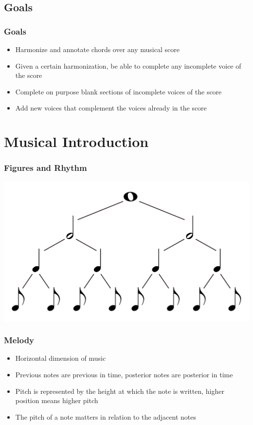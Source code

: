 \documentclass[english]{beamer}
\begin{document}
\subsection{Goals}
	\begin{frame}
	\frametitle{Goals}
		\begin{itemize}
			\item Harmonize and annotate chords over any musical score
			\item Given a certain harmonization, be able to complete any incomplete voice of the score
			\item Complete on purpose blank sections of incomplete voices of the score
			\item Add new voices that complement the voices already in the score
		\end{itemize}
	\end{frame}

\section{Musical Introduction}
	\begin{frame}
		\frametitle{Figures and Rhythm}
		\includegraphics[width=\linewidth]{imagenes/music_tree.pdf}
	\end{frame}
	
	\begin{frame}
		\frametitle{Melody}
		\begin{itemize}
			\item Horizontal dimension of music
			\item Previous notes are previous in time, posterior notes are posterior in time
			\item Pitch is represented by the height at which the note is written, higher position means higher pitch
			\item The pitch of a note matters in relation to the adjacent notes
		\end{itemize}
	\end{frame}
	
\end{document}
